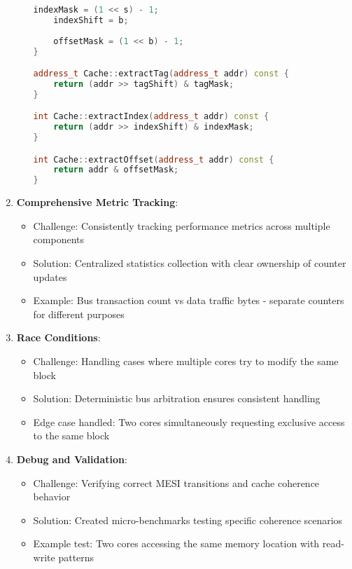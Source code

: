 \documentclass[11pt]{article}
\begin{document}
\begin{enumerate}
\begin{itemize}
\begin{lstlisting}[language=C++]
    indexMask = (1 << s) - 1;
    indexShift = b;
    
    offsetMask = (1 << b) - 1;
}

address_t Cache::extractTag(address_t addr) const {
    return (addr >> tagShift) & tagMask;
}

int Cache::extractIndex(address_t addr) const {
    return (addr >> indexShift) & indexMask;
}

int Cache::extractOffset(address_t addr) const {
    return addr & offsetMask;
}
        \end{lstlisting}
    \end{itemize}
    
    \item \textbf{Comprehensive Metric Tracking}: 
    \begin{itemize}
        \item Challenge: Consistently tracking performance metrics across multiple components
        \item Solution: Centralized statistics collection with clear ownership of counter updates
        \item Example: Bus transaction count vs data traffic bytes - separate counters for different purposes
    \end{itemize}
    
    \item \textbf{Race Conditions}: 
    \begin{itemize}
        \item Challenge: Handling cases where multiple cores try to modify the same block
        \item Solution: Deterministic bus arbitration ensures consistent handling
        \item Edge case handled: Two cores simultaneously requesting exclusive access to the same block
    \end{itemize}
    
    \item \textbf{Debug and Validation}: 
    \begin{itemize}
        \item Challenge: Verifying correct MESI transitions and cache coherence behavior
        \item Solution: Created micro-benchmarks testing specific coherence scenarios
        \item Example test: Two cores accessing the same memory location with read-write patterns
    \end{itemize}
\end{enumerate}
\end{document}
